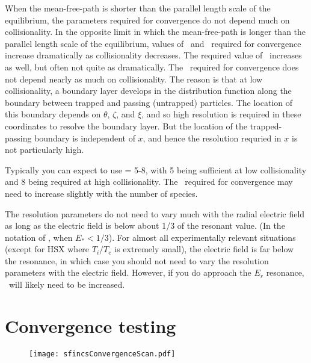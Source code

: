 When the mean-free-path is shorter than the parallel length scale of the equilibrium,
the parameters required for convergence
do not depend much on collisionality. In the opposite
limit in which the mean-free-path is longer than the parallel length scale of the equilibrium,
values of
\Nzeta~and \Nxi~required for convergence increase dramatically
as collisionality decreases. The required value of \Ntheta~increases as well, but often
not quite as dramatically. The \Nx~required for convergence does not depend
nearly as much on collisionality.  The reason is that
at low collisionality, a boundary layer develops in the distribution function
along the boundary between trapped and passing (untrapped) particles.
The location of this boundary depends on $\theta$, $\zeta$, and $\xi$,
and so high resolution is required in these coordinates to resolve the boundary layer.
But the location of the trapped-passing boundary is independent
of $x$, and hence the resolution requried in $x$ is not particularly high.

Typically you can expect to use \Nx = 5-8, with 5 being sufficient at low collisionality
and 8 being required at high collisionality.
The \Nx~required for convergence may need to increase slightly with the number of species.

The resolution parameters do not need to vary much with the radial
electric field as long as the electric field is below about 1/3 of the resonant value.
(In the notation of \cite{sfincsPaper}, when $E_*<1/3$).
For almost all experimentally relevant situations (except for HSX where $T_i/T_e$ is extremely small),
the electric field is far below the resonance, in which case you should not need to vary the resolution
parameters with the electric field.
However, if you do approach the $E_r$ resonance, \Nx~will likely need to be increased.

\section{Convergence testing}
\label{sec:convergence}

\begin{figure}
\begin{center}
\texttt{[image: sfincsConvergenceScan.pdf]}
\end{center}
\end{figure}

